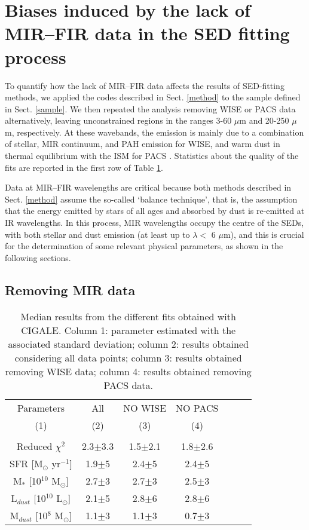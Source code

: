 \documentclass{aa}
\begin{document}
\section{Biases induced by the lack of MIR--FIR data in the SED fitting process}
\label{results}

To quantify how the lack of MIR--FIR data affects the results of SED-fitting methods, we applied the codes described in Sect. \ref{method} to the sample defined in Sect. \ref{sample}. We then repeated the analysis removing WISE or PACS data alternatively, leaving unconstrained regions in the ranges 3-60 $\mu$m and 20-250 $\mu$m, respectively. At these wavebands, the emission is mainly due to a combination of stellar, MIR continuum, and PAH emission for WISE, and warm dust in thermal equilibrium with the ISM for PACS \citep{dra}. Statistics about the quality of the fits are reported in the first row of Table \ref{res}.

Data at MIR--FIR wavelengths  are critical because both methods described in Sect. \ref{method} assume the so-called `balance technique', that is, the assumption that the energy emitted by stars of all ages and absorbed by dust is re-emitted at IR wavelengths. In this process, MIR wavelengths occupy the centre of the SEDs, with both stellar and dust emission (at least up to $\lambda <$ 6 $\mu$m), and this is crucial for the determination of some relevant physical parameters, as shown in the following sections.

\subsection{Removing MIR data}
\label{sec_nowise}

  \begin{table}
   \centering
   \caption{Median results from the different fits obtained with CIGALE. Column 1: parameter estimated with the associated standard deviation; column 2: results obtained considering all data points; column 3: results obtained removing WISE data; column 4: results obtained removing PACS data.}
   \begin{tabular}{ccccccc}
    \hline
    Parameters & All & NO WISE& NO PACS\\
    (1) & (2) & (3) & (4) \\%
    \hline
    \\
    Reduced $\chi^2$ & 2.3$\pm$3.3 & 1.5$\pm$2.1 & 1.8$\pm$2.6\\
    SFR [M$_\odot$ yr$^{-1}$]   & 1.9$\pm$5 & 2.4$\pm$5 & 2.4$\pm$5\\
    M$_\ast$   [10$^{10}$ M$_\odot$] & 2.7$\pm$3 & 2.7$\pm$3 & 2.5$\pm$3\\
    L$_{dust}$ [10$^{10}$ L$_\odot$] & 2.1$\pm$5 & 2.8$\pm$6 & 2.8$\pm$6\\
    M$_{dust}$ [10$^{8}$ M$_\odot$]  & 1.1$\pm$3 & 1.1$\pm$3 & 0.7$\pm$3\\
    \hline
   \end{tabular}\label{res}
  \end{table}
\end{document}

